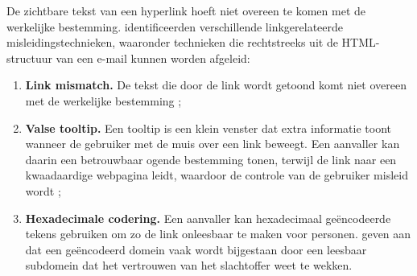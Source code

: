 De zichtbare tekst van een hyperlink hoeft niet overeen te komen met de werkelijke bestemming. \textcite{Veit2025} identificeerden verschillende linkgerelateerde misleidingstechnieken, waaronder technieken die rechtstreeks uit de HTML-structuur van een e-mail kunnen worden afgeleid:

\begin{enumerate}
    \item \textbf{Link mismatch.} De tekst die door de link wordt getoond komt niet overeen met de werkelijke bestemming \autocite{Fette2007,Veit2025};
    \item \textbf{Valse tooltip.} Een tooltip is een klein venster dat extra informatie toont wanneer de gebruiker met de muis over een link beweegt. Een aanvaller kan daarin een betrouwbaar ogende bestemming tonen, terwijl de link naar een kwaadaardige webpagina leidt, waardoor de controle van de gebruiker misleid wordt \autocite{Veit2025};
    \item \textbf{Hexadecimale codering.} Een aanvaller kan hexadecimaal geëncodeerde tekens gebruiken om zo de link onleesbaar te maken voor personen. \textcite{Veit2025} geven aan dat een geëncodeerd domein vaak wordt bijgestaan door een leesbaar subdomein dat het vertrouwen van het slachtoffer weet te wekken.
\end{enumerate}
